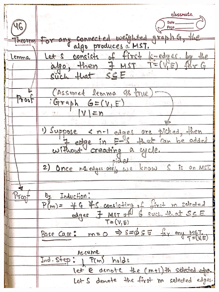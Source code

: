\begin{figure}[H]
    \centering
    \includegraphics[width=16cm, height=21cm]{"./MIT-6.042J/MIT-6042J-046"}
\end{figure}
\newpage
